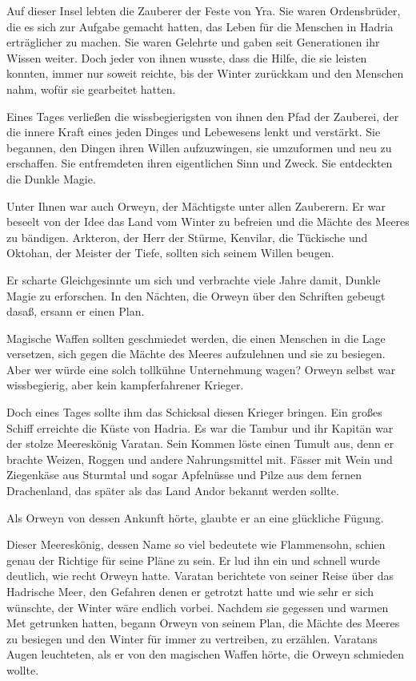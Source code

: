 \documentclass[10pt, a4paper, oneside]{book}
\begin{document}
\begin{multicols}{2}
Auf dieser Insel lebten die Zauberer der Feste von Yra. Sie waren Ordensbrüder, die es sich zur Aufgabe gemacht hatten, das Leben für die Menschen in Hadria erträglicher zu machen. Sie waren Gelehrte und gaben seit Generationen ihr Wissen weiter. Doch jeder von ihnen wusste, dass die Hilfe, die sie leisten konnten, immer nur soweit reichte, bis der Winter zurückkam und den Menschen nahm, wofür sie gearbeitet hatten.\bigskip

Eines Tages verließen die wissbegierigsten von ihnen den Pfad der Zauberei, der die innere Kraft eines jeden Dinges und Lebewesens lenkt und verstärkt. Sie begannen, den Dingen ihren Willen aufzuzwingen, sie umzuformen und neu zu erschaffen. Sie entfremdeten ihren eigentlichen Sinn und Zweck. Sie entdeckten die Dunkle Magie.\bigskip

Unter Ihnen war auch Orweyn, der Mächtigste unter allen Zauberern. Er war beseelt von der Idee das Land vom Winter zu befreien und die Mächte des Meeres zu bändigen. Arkteron, der Herr der Stürme, Kenvilar, die Tückische und Oktohan, der Meister der Tiefe, sollten sich seinem Willen beugen.\bigskip

Er scharte Gleichgesinnte um sich und verbrachte viele Jahre damit, Dunkle Magie zu erforschen. In den Nächten, die Orweyn über den Schriften gebeugt dasaß, ersann er einen Plan.\bigskip

Magische Waffen sollten geschmiedet werden, die einen Menschen in die Lage versetzen, sich gegen die Mächte des Meeres aufzulehnen und sie zu besiegen. Aber wer würde eine solch tollkühne Unternehmung wagen? Orweyn selbst war wissbegierig, aber kein kampferfahrener Krieger.\bigskip

Doch eines Tages sollte ihm das Schicksal diesen Krieger bringen. Ein großes Schiff erreichte die Küste von Hadria. Es war die Tambur und ihr Kapitän war der stolze Meereskönig Varatan. Sein Kommen löste einen Tumult aus, denn er brachte Weizen, Roggen und andere Nahrungsmittel mit. Fässer mit Wein und Ziegenkäse aus Sturmtal und sogar Apfelnüsse und Pilze aus dem fernen Drachenland, das später als das Land Andor bekannt werden sollte.\bigskip

Als Orweyn von dessen Ankunft hörte, glaubte er an eine glückliche Fügung.\bigskip

Dieser Meereskönig, dessen Name so viel bedeutete wie Flammensohn, schien genau der Richtige für seine Pläne zu sein. Er lud ihn ein und schnell wurde deutlich, wie recht Orweyn hatte. Varatan berichtete von seiner Reise über das Hadrische Meer, den Gefahren denen er getrotzt hatte und wie sehr er sich wünschte, der Winter wäre endlich vorbei. Nachdem sie gegessen und warmen Met getrunken hatten, begann Orweyn von seinem Plan, die Mächte des Meeres zu besiegen und den Winter für immer zu vertreiben, zu erzählen. Varatans Augen leuchteten, als er von den magischen Waffen hörte, die Orweyn schmieden wollte.\bigskip


\end{multicols}
\end{document}
